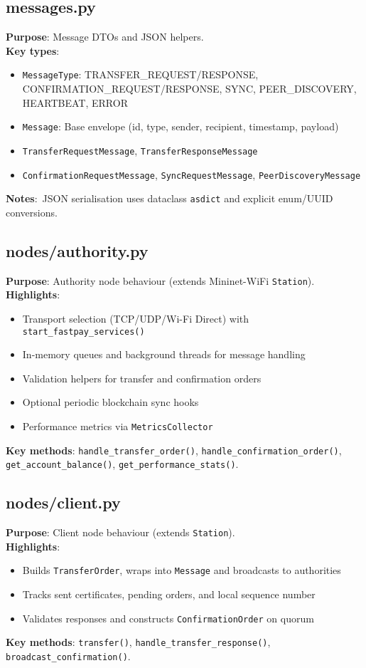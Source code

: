 \documentclass[11pt,a4paper]{article}
\begin{document}
\subsection{messages.py}
\textbf{Purpose}: Message DTOs and JSON helpers.\\
\textbf{Key types}:
\begin{itemize}[noitemsep]
  \item \texttt{MessageType}: TRANSFER\_REQUEST/RESPONSE, CONFIRMATION\_REQUEST/RESPONSE, SYNC, PEER\_DISCOVERY, HEARTBEAT, ERROR
  \item \texttt{Message}: Base envelope (id, type, sender, recipient, timestamp, payload)
  \item \texttt{TransferRequestMessage}, \texttt{TransferResponseMessage}
  \item \texttt{ConfirmationRequestMessage}, \texttt{SyncRequestMessage}, \texttt{PeerDiscoveryMessage}
\end{itemize}
\textbf{Notes}:\ JSON serialisation uses dataclass \texttt{asdict} and explicit enum/UUID conversions.

\subsection{nodes/authority.py}
\textbf{Purpose}: Authority node behaviour (extends Mininet-WiFi \texttt{Station}).\\
\textbf{Highlights}:
\begin{itemize}[noitemsep]
  \item Transport selection (TCP/UDP/Wi-Fi Direct) with \texttt{start\_fastpay\_services()}
  \item In-memory queues and background threads for message handling
  \item Validation helpers for transfer and confirmation orders
  \item Optional periodic blockchain sync hooks
  \item Performance metrics via \texttt{MetricsCollector}
\end{itemize}
\textbf{Key methods}: \texttt{handle\_transfer\_order()}, \texttt{handle\_confirmation\_order()}, \texttt{get\_account\_balance()}, \texttt{get\_performance\_stats()}.

\subsection{nodes/client.py}
\textbf{Purpose}: Client node behaviour (extends \texttt{Station}).\\
\textbf{Highlights}:
\begin{itemize}[noitemsep]
  \item Builds \texttt{TransferOrder}, wraps into \texttt{Message} and broadcasts to authorities
  \item Tracks sent certificates, pending orders, and local sequence number
  \item Validates responses and constructs \texttt{ConfirmationOrder} on quorum
\end{itemize}
\textbf{Key methods}: \texttt{transfer()}, \texttt{handle\_transfer\_response()}, \texttt{broadcast\_confirmation()}.
\end{document}
